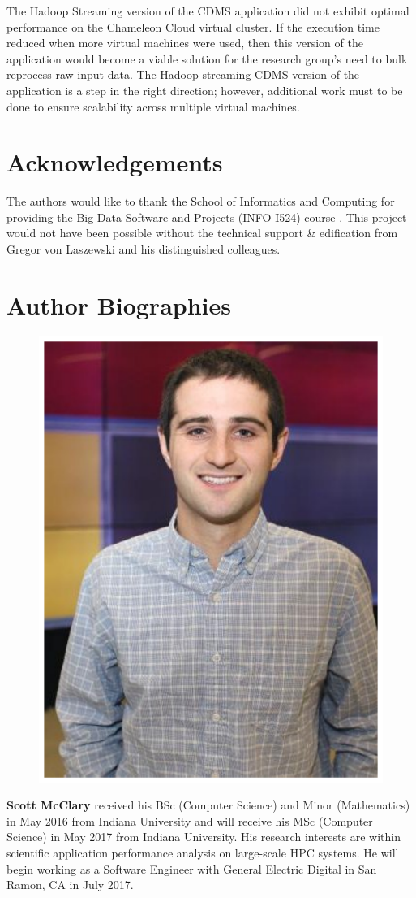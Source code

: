 \documentclass[9pt,twocolumn,twoside]{../../styles/osajnl}
\begin{document}
The Hadoop Streaming version of the CDMS application did not exhibit
optimal performance on the Chameleon Cloud virtual cluster. If the
execution time reduced when more virtual machines were used, then this
version of the application would become a viable solution for the
research group's need to bulk reprocess raw input data. The Hadoop
streaming CDMS version of the application is a step in the right
direction; however, additional work must to be done to ensure
scalability across multiple virtual machines.

\section*{Acknowledgements}
The authors would like to thank the School of Informatics and
Computing for providing the Big Data Software and Projects (INFO-I524)
course \cite{www-i524}. This project would not have been possible
without the technical support \& edification from Gregor von Laszewski
and his distinguished colleagues.

 
\section*{Author Biographies}
\begingroup
\setlength\intextsep{0pt}
\begin{minipage}[t][3.2cm][t]{1.0\columnwidth} 
  \begin{figure}
    \includegraphics[width=0.25\columnwidth]{images/scott_mcclary}
  \end{figure}
  \noindent
  {\bfseries Scott McClary} received his BSc (Computer Science) and
  Minor (Mathematics) in May 2016 from Indiana University and will
  receive his MSc (Computer Science) in May 2017 from Indiana
  University. His research interests are within scientific application
  performance analysis on large-scale HPC systems. He will begin
  working as a Software Engineer with General Electric Digital in San
  Ramon, CA in July 2017.
\end{minipage}
\endgroup
\end{document}
